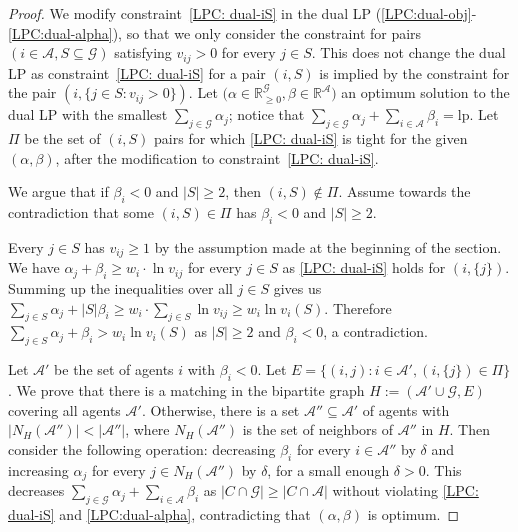 \documentclass[10pt,a4paper]{article}
\theoremstyle{definition}
\theoremstyle{plain}
\newcommand\calA{{\mathcal{A}}}
\newcommand\calG{{\mathcal{G}}}
\newcommand{\R}{{\mathbb{R}}}
\newcommand{\lp}{\mathrm{lp}}
\begin{document}
    \begin{proof}
        We modify constraint~\eqref{LPC: dual-iS} in the dual LP  (\ref{LPC:dual-obj}-\ref{LPC:dual-alpha}), so that we only consider the constraint for pairs $(i \in \calA, S \subseteq \calG)$ satisfying $v_{ij} > 0$ for every $j \in S$. This does not change the dual LP as constraint~\eqref{LPC: dual-iS} for a pair $(i, S)$ is implied by the constraint for the pair $(i, \{j \in S: v_{ij}> 0\})$. Let $\big(\alpha \in \R_{\geq 0}^\calG, \beta \in \R^{\calA}\big)$ an optimum solution to the dual LP with the smallest $\sum_{j \in \calG}\alpha_j$; notice that $\sum_{j \in \calG}\alpha_j + \sum_{i \in \calA} \beta_i = \lp$. Let $\Pi$ be the set of $(i, S)$ pairs for which \eqref{LPC: dual-iS} is tight for the given $(\alpha, \beta)$, after the modification to constraint~\eqref{LPC: dual-iS}.
            
        We argue that if $\beta_i < 0$ and $|S| \geq 2$, then $(i, S) \notin \Pi$. Assume towards the contradiction that some $(i, S) \in \Pi$ has $\beta_i < 0$ and $|S| \geq 2$.  
        
        Every $j \in S$ has $v_{ij} \geq 1$ by the assumption made at the beginning of the section.  We have $\alpha_j + \beta_i\geq w_i\cdot \ln v_{ij}$ for every $j \in S$ as \eqref{LPC: dual-iS} holds for $(i, \{j\})$. Summing up the inequalities over all $j \in S$ gives us $\sum_{j \in S}\alpha_j + |S|\beta_i \geq w_i \cdot \sum_{j \in S}\ln v_{ij} \geq w_i \ln v_i(S)$. Therefore $\sum_{j \in S}\alpha_j + \beta_i > w_i \ln v_i(S)$ as $|S|\geq 2$ and $\beta_i < 0$, a contradiction.
    
        Let $\calA'$ be the set of agents $i$ with $\beta_i < 0$. Let $E = \big\{(i, j): i \in \calA', (i, \{j\}) \in \Pi\big\}$. We prove that there is a matching in the bipartite graph $H:= (\calA' \cup \calG, E)$ covering all agents $\calA'$. Otherwise, there is a set $\calA'' \subseteq \calA'$ of agents with $|N_H(\calA'')| < |\calA''|$, where $N_H(\calA'')$ is the set of neighbors of $\calA''$ in $H$. Then consider the following operation: decreasing $\beta_i$ for every $i \in \calA''$ by $\delta$ and increasing $\alpha_j$ for every $j \in N_H(\calA'')$ by $\delta$, for a small enough $\delta > 0$. This decreases $\sum_{j \in \calG}\alpha_j + \sum_{i \in \calA}\beta_i$ as $|C \cap \calG|\geq |C \cap \calA|$ without violating \eqref{LPC: dual-iS} and \eqref{LPC:dual-alpha}, contradicting that $(\alpha, \beta)$ is optimum. 


\end{proof}
\end{document}
